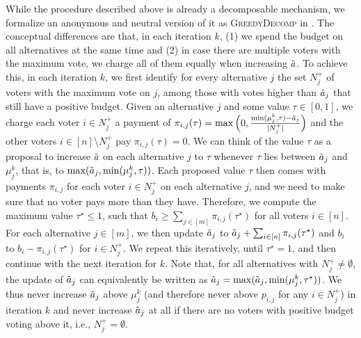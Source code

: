 \documentclass[11pt]{article}
\newcommand{\GrdDec}{\textsc{GreedyDecomp} }
\begin{document}
While the procedure described above is already a decomposable mechanism, we formalize an anonymous and neutral version of it as \GrdDec in . The conceptual differences are that, in each iteration $k$, (1) we spend the budget on all alternatives at the same time and (2) in case there are multiple voters with the maximum vote, we charge all of them equally when increasing $\Tilde{a}$.
To achieve this, in each iteration $k$, we first identify for every alternative $j$ the set $N_j^+$ of voters with the maximum vote on $j$, among those with votes higher than $\Tilde{a}_j$ that still have a positive budget. 
Given an alternative $j$ and some value $\tau \in [0,1]$, we charge each voter $i \in N_j^+$ a payment of $\pi_{i,j}(\tau) = \max\Big(0, \frac{\min(\mu^k_j, \tau) - \Tilde{a}_j}{|N_j^+|}\Big)$ and the other voters $i \in [n] \setminus N_j^+$ pay $\pi_{i,j}(\tau) = 0$. 
We can think of the value $\tau$ as a proposal to increase $\Tilde{a}$ on each alternative $j$ to $\tau$ whenever $\tau$ lies between $\Tilde{a}_j$ and $\mu^k_j$, that is, to $\max(\Tilde{a}_j, \min(\mu^k_j, \tau))$. 
Each proposed value $\tau$ then comes with payments $\pi_{i,j}$ for each voter $i \in N^+_j$ on each alternative $j$, and we need to make sure that no voter pays more than they have. Therefore, we compute the maximum value $\tau^\star \le 1$, such that $b_i \ge \sum_{j \in [m]} \pi_{i,j}(\tau^\star)$ for all voters $i \in [n]$.
For each alternative $j \in [m]$, we then update $\Tilde{a}_j$ to $\Tilde{a}_j + \sum_{i\in [n]} \pi_{i,j}(\tau^\star)$ and $b_i$ to $b_i - \pi_{i,j}(\tau^\star)$ for $i \in N_j^+$. We repeat this iteratively, until $\tau^\star = 1$, and then continue with the next iteration for $k$. 
Note that, for all alternatives with $N^+_j \neq \emptyset$, the update of $\Tilde{a}_j$ can equivalently be written as $\Tilde{a}_j = \max(\Tilde{a}_j, \min(\mu^k_j, \tau^\star))$. We thus never increase $\Tilde{a}_j$ above $\mu^k_j$ (and therefore never above $p_{i,j}$ for any $i \in N_j^+$) in iteration $k$ and never increase $\Tilde{a}_j$ at all if there are no voters with positive budget voting above it, i.e., $N^+_j = \emptyset$.
\end{document}
